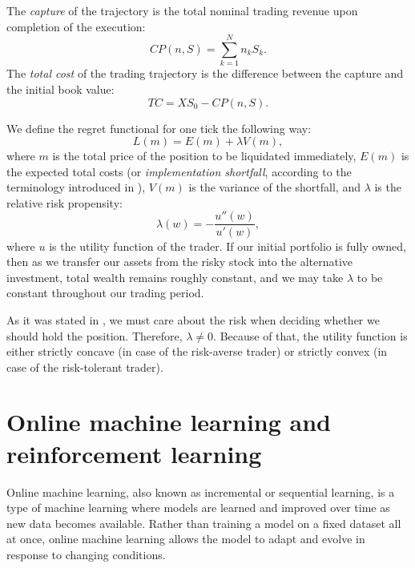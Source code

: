     \begin{definition}
        The \emph{capture} of the trajectory is the total nominal trading revenue upon completion of the execution:
        \begin{equation*}
            CP(n, S) = \sum_{k=1}^{N} n_kS_k.
        \end{equation*}
        The \emph{total cost} of the trading trajectory is the difference between the capture and the initial book value:
        \begin{equation*}
            TC = XS_0 - CP(n, S).
        \end{equation*}
    \end{definition}
    We define the regret functional for one tick the following way:
    \begin{equation*}
        L(m) = E(m) + \lambda V(m),
    \end{equation*}
    where $m$ is the total price of the position to be liquidated immediately, $E(m)$ is the expected total costs (or \emph{implementation shortfall}, according to the terminology introduced in \cite{Perold1988}), $V(m)$ is the variance of the shortfall, and $\lambda$ is the relative risk propensity:
    \begin{equation*}
        \lambda(w) = -\frac{u''(w)}{u'(w)},
    \end{equation*}
    where $u$ is the utility function of the trader. If our initial portfolio is fully owned, then as we transfer our assets from the risky stock into the alternative investment,
    total wealth remains roughly constant, and we may take $\lambda$ to be constant throughout our trading period.
    
    As it was stated in \cite{Almgren2000}, we must care about the risk when deciding whether we should hold the position. Therefore, $\lambda \ne 0$. Because of that, 
    the utility function is either strictly concave (in case of the risk-averse trader) or strictly convex (in case of the risk-tolerant trader).

\section{Online machine learning and reinforcement learning}
    Online machine learning, also known as incremental or sequential learning, is a type of machine learning where models are learned and improved over time as new data becomes available. Rather than training a model on a fixed dataset all at once, online machine learning allows the model to adapt and evolve in response to changing conditions.

